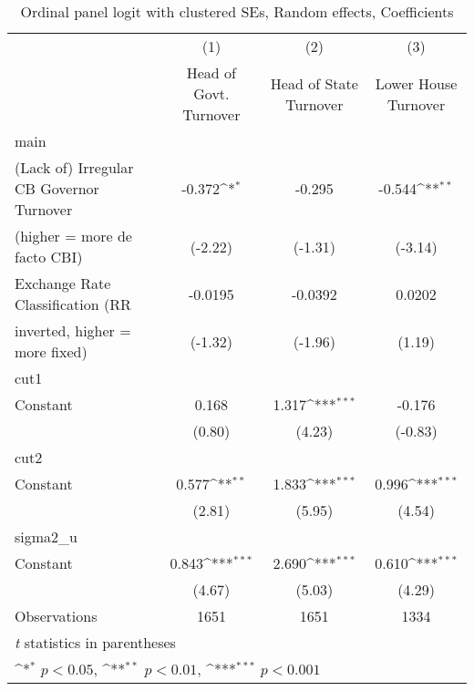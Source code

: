 \begin{table}[htbp]\centering
\def\sym#1{\ifmmode^{#1}\else\(^{#1}\)\fi}
\caption{Ordinal panel logit with clustered SEs, Random effects, Coefficients \label{coeffordLogDF}}
\begin{tabular}{l*{3}{c}}
\toprule
                                        &\multicolumn{1}{c}{(1)}&\multicolumn{1}{c}{(2)}&\multicolumn{1}{c}{(3)}\\
                                        &\multicolumn{1}{c}{Head of Govt. Turnover}&\multicolumn{1}{c}{Head of State Turnover}&\multicolumn{1}{c}{Lower House Turnover}\\
\midrule
main                                    &                  &                  &                  \\
(Lack of) Irregular CB Governor Turnover&   -0.372\sym{*}  &   -0.295         &   -0.544\sym{**} \\
(higher = more de facto CBI)            &  (-2.22)         &  (-1.31)         &  (-3.14)         \\
\addlinespace
Exchange Rate Classification (RR        &  -0.0195         &  -0.0392         &   0.0202         \\
inverted, higher = more fixed)          &  (-1.32)         &  (-1.96)         &   (1.19)         \\
\midrule
cut1                                    &                  &                  &                  \\
Constant                                &    0.168         &    1.317\sym{***}&   -0.176         \\
                                        &   (0.80)         &   (4.23)         &  (-0.83)         \\
\midrule
cut2                                    &                  &                  &                  \\
Constant                                &    0.577\sym{**} &    1.833\sym{***}&    0.996\sym{***}\\
                                        &   (2.81)         &   (5.95)         &   (4.54)         \\
\midrule
sigma2\_u                                &                  &                  &                  \\
Constant                                &    0.843\sym{***}&    2.690\sym{***}&    0.610\sym{***}\\
                                        &   (4.67)         &   (5.03)         &   (4.29)         \\
\midrule
Observations                            &     1651         &     1651         &     1334         \\
\bottomrule
\multicolumn{4}{l}{\footnotesize \textit{t} statistics in parentheses}\\
\multicolumn{4}{l}{\footnotesize \sym{*} \(p<0.05\), \sym{**} \(p<0.01\), \sym{***} \(p<0.001\)}\\
\end{tabular}
\end{table}
